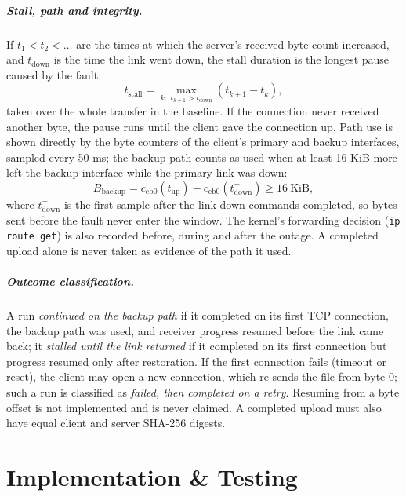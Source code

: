 \documentclass[12pt,a4paper]{report}
\numberwithin{equation}{chapter}
\begin{document}
\paragraph{Stall, path and integrity.} If $t_1 < t_2 < \dots$ are the times at which the server's received byte count increased, and $t_{\mathrm{down}}$ is the time the link went down, the stall duration is the longest pause caused by the fault:
\begin{equation}
t_{\mathrm{stall}} = \max_{k\,:\,t_{k+1} > t_{\mathrm{down}}} \left(t_{k+1} - t_k\right),
\label{eq:stall}
\end{equation}
taken over the whole transfer in the baseline. If the connection never received another byte, the pause runs until the client gave the connection up. Path use is shown directly by the byte counters of the client's primary and backup interfaces, sampled every 50 ms; the backup path counts as used when at least 16 KiB more left the backup interface while the primary link was down:
\begin{equation}
B_{\mathrm{backup}} = c_{\mathrm{cb0}}(t_{\mathrm{up}}) - c_{\mathrm{cb0}}(t^{+}_{\mathrm{down}}) \ge 16\ \mathrm{KiB},
\label{eq:backup}
\end{equation}
where $t^{+}_{\mathrm{down}}$ is the first sample after the link-down commands completed, so bytes sent before the fault never enter the window. The kernel's forwarding decision (\texttt{ip route get}) is also recorded before, during and after the outage. A completed upload alone is never taken as evidence of the path it used.

\paragraph{Outcome classification.} A run \emph{continued on the backup path} if it completed on its first TCP connection, the backup path was used, and receiver progress resumed before the link came back; it \emph{stalled until the link returned} if it completed on its first connection but progress resumed only after restoration. If the first connection fails (timeout or reset), the client may open a new connection, which re-sends the file from byte 0; such a run is classified as \emph{failed, then completed on a retry}. Resuming from a byte offset is not implemented and is never claimed. A completed upload must also have equal client and server SHA-256 digests.

\chapter{Implementation \& Testing}
\end{document}
